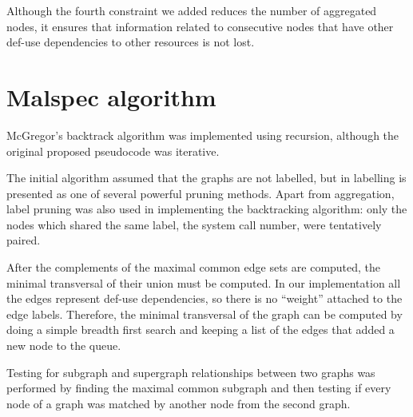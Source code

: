 Although the fourth constraint we added reduces the number of aggregated nodes, it ensures that information related to consecutive nodes that have other def-use dependencies to other resources is not lost.

\section{Malspec algorithm}
\label{fourth:malspec-alg}

McGregor's backtrack algorithm was implemented using recursion, although the original proposed pseudocode was iterative.

The initial algorithm assumed that the graphs are not labelled, but in \cite{minimal-contrast-subgraph} labelling is presented as one of several powerful pruning methods. Apart from aggregation, label pruning was also used in implementing the backtracking algorithm: only the nodes which shared the same label, the system call number, were tentatively paired.

After the complements of the maximal common edge sets are computed, the minimal transversal of their union must be computed. In our implementation all the edges represent def-use dependencies, so there is no ``weight'' attached to the edge labels. Therefore, the minimal transversal of the graph can be computed by doing a simple breadth first search and keeping a list of the edges that added a new node to the queue.

Testing for subgraph and supergraph relationships between two graphs was performed by finding the maximal common subgraph and then testing if every node of a graph was matched by another node from the second graph.
